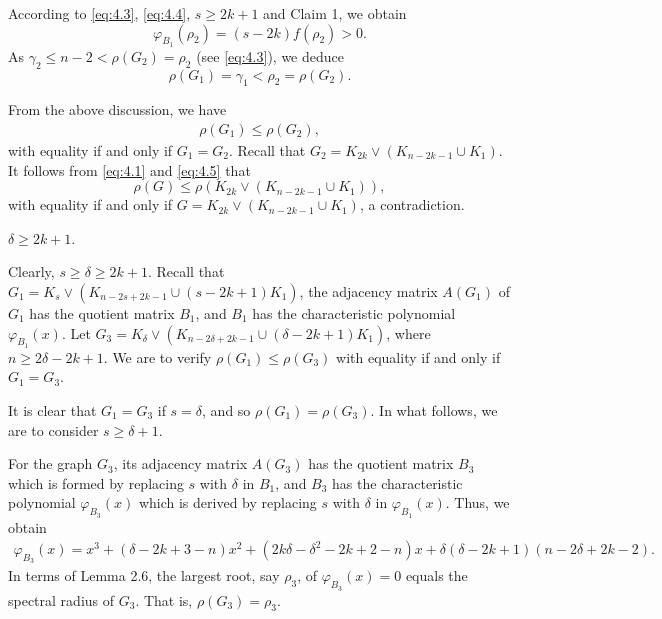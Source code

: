 \documentclass[10pt]{article}
\numberwithin{equation}{section}
\begin{document}
According to \eqref{eq:4.3}, \eqref{eq:4.4}, $s\geq2k+1$ and Claim 1, we obtain
$$
\varphi_{B_1}(\rho_2)=(s-2k)f(\rho_2)>0.
$$
As $\gamma_2\leq n-2<\rho(G_2)=\rho_2$ (see \eqref{eq:4.3}), we deduce
$$
\rho(G_1)=\gamma_1<\rho_2=\rho(G_2).
$$

From the above discussion, we have
\begin{align}\label{eq:4.5}
\rho(G_1)\leq\rho(G_2),
\end{align}
with equality if and only if $G_1=G_2$. Recall that $G_2=K_{2k}\vee(K_{n-2k-1}\cup K_1)$. It follows from \eqref{eq:4.1} and \eqref{eq:4.5} that
$$
\rho(G)\leq\rho(K_{2k}\vee(K_{n-2k-1}\cup K_1)),
$$
with equality if and only if $G=K_{2k}\vee(K_{n-2k-1}\cup K_1)$, a contradiction.

\medskip

 $\delta\geq2k+1$.

Clearly, $s\geq\delta\geq2k+1$. Recall that $G_1=K_s\vee(K_{n-2s+2k-1}\cup(s-2k+1)K_1)$, the adjacency matrix $A(G_1)$ of $G_1$ has the quotient
matrix $B_1$, and $B_1$ has the characteristic polynomial $\varphi_{B_1}(x)$. Let $G_3=K_{\delta}\vee(K_{n-2\delta+2k-1}\cup(\delta-2k+1)K_1)$,
where $n\geq2\delta-2k+1$. We are to verify $\rho(G_1)\leq\rho(G_3)$ with equality if and only if $G_1=G_3$.

It is clear that $G_1=G_3$ if $s=\delta$, and so $\rho(G_1)=\rho(G_3)$. In what follows, we are to consider $s\geq\delta+1$.

For the graph $G_3$, its adjacency matrix $A(G_3)$ has the quotient matrix $B_3$ which is formed by replacing $s$ with $\delta$ in $B_1$, and $B_3$
has the characteristic polynomial $\varphi_{B_3}(x)$ which is derived by replacing $s$ with $\delta$ in $\varphi_{B_1}(x)$. Thus, we obtain
\begin{align*}
\varphi_{B_3}(x)=x^{3}+(\delta-2k+3-n)x^{2}+(2k\delta-\delta^{2}-2k+2-n)x+\delta(\delta-2k+1)(n-2\delta+2k-2).
\end{align*}
In terms of Lemma 2.6, the largest root, say $\rho_3$, of $\varphi_{B_3}(x)=0$ equals the spectral radius of $G_3$. That is, $\rho(G_3)=\rho_3$.
\end{document}
